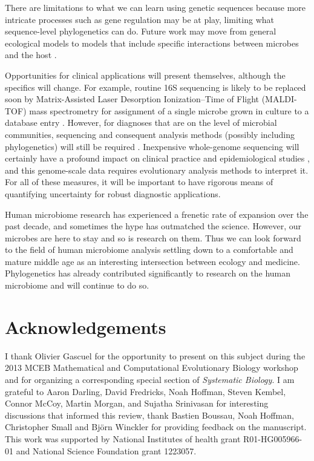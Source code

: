 \documentclass{amsart}
\begin{document}
There are limitations to what we can learn using genetic sequences because more intricate processes such as gene regulation may be at play, limiting what sequence-level phylogenetics can do.
Future work may move from general ecological models to models that include specific interactions between microbes and the host \citep[reviewed in][]{hooper2012interactions}.

Opportunities for clinical applications will present themselves, although the specifics will change.
For example, routine 16S sequencing is likely to be replaced soon by Matrix-Assisted Laser Desorption Ionization--Time of Flight (MALDI-TOF) mass spectrometry for assignment of a single microbe grown in culture to a database entry \citep{clark2013matrix}.
However, for diagnoses that are on the level of microbial communities, sequencing and consequent analysis methods (possibly including phylogenetics) will still be required \citep[reviewed in][]{Rogers2013271}.
Inexpensive whole-genome sequencing will certainly have a profound impact on clinical practice and epidemiological studies \citep{didelot2012transforming}, and this genome-scale data requires evolutionary analysis methods to interpret it.
For all of these measures, it will be important to have rigorous means of quantifying uncertainty for robust diagnostic applications.

Human microbiome research has experienced a frenetic rate of expansion over the past decade, and sometimes the hype has outmatched the science.
However, our microbes are here to stay and so is research on them.
Thus we can look forward to the field of human microbiome analysis settling down to a comfortable and mature middle age as an interesting intersection between ecology and medicine.
Phylogenetics has already contributed significantly to research on the human microbiome and will continue to do so.



\section{Acknowledgements}
I thank Olivier Gascuel for the opportunity to present on this subject during the 2013 MCEB Mathematical and Computational Evolutionary Biology workshop and for organizing a corresponding special section of \textit{Systematic Biology}.
I am grateful to Aaron Darling, David Fredricks, Noah Hoffman, Steven Kembel, Connor McCoy, Martin Morgan, and Sujatha Srinivasan for interesting discussions that informed this review, thank Bastien Boussau, Noah Hoffman, Christopher Small and Bj\"orn Winckler for providing feedback on the manuscript.
This work was supported by National Institutes of health grant R01-HG005966-01 and National Science Foundation grant 1223057.
\end{document}
